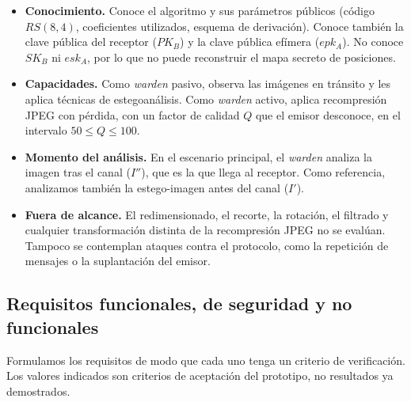 \documentclass[IB]{TFUOC}%
\begin{document}
\begin{itemize}
    \item \textbf{Conocimiento.} Conoce el algoritmo y sus parámetros públicos (código $RS(8,4)$, coeficientes utilizados, esquema de derivación). Conoce también la clave pública del receptor ($PK_B$) y la clave pública efímera ($epk_A$). No conoce $SK_B$ ni $esk_A$, por lo que no puede reconstruir el mapa secreto de posiciones.
    \item \textbf{Capacidades.} Como \textit{warden} pasivo, observa las imágenes en tránsito y les aplica técnicas de estegoanálisis. Como \textit{warden} activo, aplica recompresión JPEG con pérdida, con un factor de calidad $Q$ que el emisor desconoce, en el intervalo $50\leq Q\leq 100$.
    \item \textbf{Momento del análisis.} En el escenario principal, el \textit{warden} analiza la imagen tras el canal ($I''$), que es la que llega al receptor. Como referencia, analizamos también la estego-imagen antes del canal ($I'$).
    \item \textbf{Fuera de alcance.} El redimensionado, el recorte, la rotación, el filtrado y cualquier transformación distinta de la recompresión JPEG no se evalúan. Tampoco se contemplan ataques contra el protocolo, como la repetición de mensajes o la suplantación del emisor.
\end{itemize}

\subsection{Requisitos funcionales, de seguridad y no funcionales}
\label{subsec:requisitos_funcionales}

Formulamos los requisitos de modo que cada uno tenga un criterio de verificación. Los valores indicados son criterios de aceptación del prototipo, no resultados ya demostrados.
\end{document}
